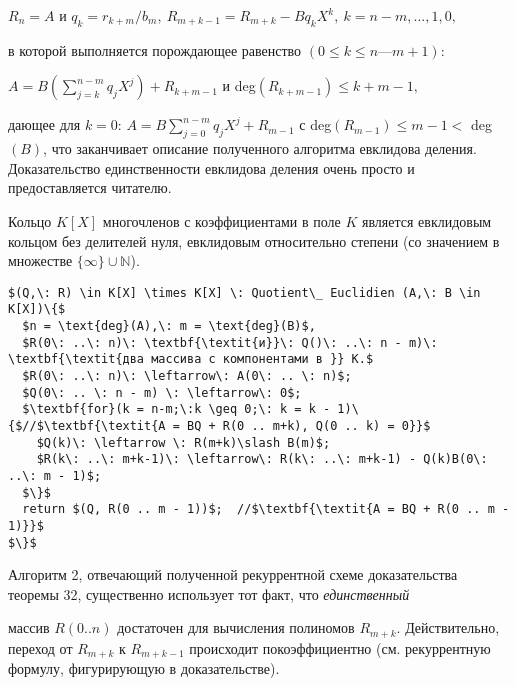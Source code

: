 \documentclass{mai_book}
\begin{document}
\begin{center}
\noindent$R_n = A$ и $q_k = r_{k+m}\slash b_m,\: R_{m+k-1}=R_{m+k} - Bq_kX^k,\: k = n-m,...,1,0,$
\end{center}

\noindent в которой выполняется порождающее равенство $(0 \leqslant k \leqslant n — m + 1)$: 

\begin{center}
$A = B\left(\sum\limits_{j=k}^{n-m}q_jX^j\right)+R_{k+m-1}$ и deg$(R_{k+m-1})\leqslant k+m-1,$
\end{center}

\noindent дающее для $k = 0$: $A =B\sum_{j=0}^{n-m}q_jX^j + R_{m-1}$ с deg$(R_{m-1}) \leqslant m - 1 <$ 
deg$(B)$, что заканчивает описание полученного алгоритма евклидова 
деления. Доказательство единственности евклидова деления очень  
просто и предоставляется читателю. 

\begin{sled}
\hspace*{15pt}Кольцо $K[X]$ многочленов с коэффициентами в поле $K$ является  
евклидовым кольцом без делителей нуля, евклидовым относительно  
степени (со значением в множестве $\{\infty\}\cup \mathbb{N}$).\newline
\end{sled}

\begin{lstlisting}[mathescape=true, caption=Евклидово деление многочленов над полем]
$(Q,\: R) \in K[X] \times K[X] \: Quotient\_ Euclidien (A,\: B \in K[X])\{$
  $n = \text{deg}(A),\: m = \text{deg}(B)$,
  $R(0\: ..\: n)\: \textbf{\textit{и}}\: Q()\: ..\: n - m)\: \textbf{\textit{два массива с компонентами в }} K.$
  $R(0\: ..\: n)\: \leftarrow\: A(0\: .. \: n)$;
  $Q(0\: .. \: n - m) \: \leftarrow\: 0$;
  $\textbf{for}(k = n-m;\:k \geq 0;\: k = k - 1)\{$//$\textbf{\textit{A = BQ + R(0 .. m+k), Q(0 .. k) = 0}}$
    $Q(k)\: \leftarrow \: R(m+k)\slash B(m)$;
    $R(k\: ..\: m+k-1)\: \leftarrow\: R(k\: ..\: m+k-1) - Q(k)B(0\: ..\: m - 1)$;
  $\}$
  return $(Q, R(0 .. m - 1))$;  //$\textbf{\textit{A = BQ + R(0 .. m - 1)}}$
$\}$
\end{lstlisting}

Алгоритм 2, отвечающий полученной рекуррентной схеме  
доказательства теоремы 32, существенно использует тот факт, что \textit{единственный}
\newpage

\noindent массив $R(0 .. n)$ достаточен для вычисления полиномов $R_{m+k}$. 
Действительно, переход от $R_{m+k}$ к $R_{m+k-1}$ происходит покоэффициентно
 (см. рекуррентную формулу, фигурирующую в доказательстве).
 
\end{document}
